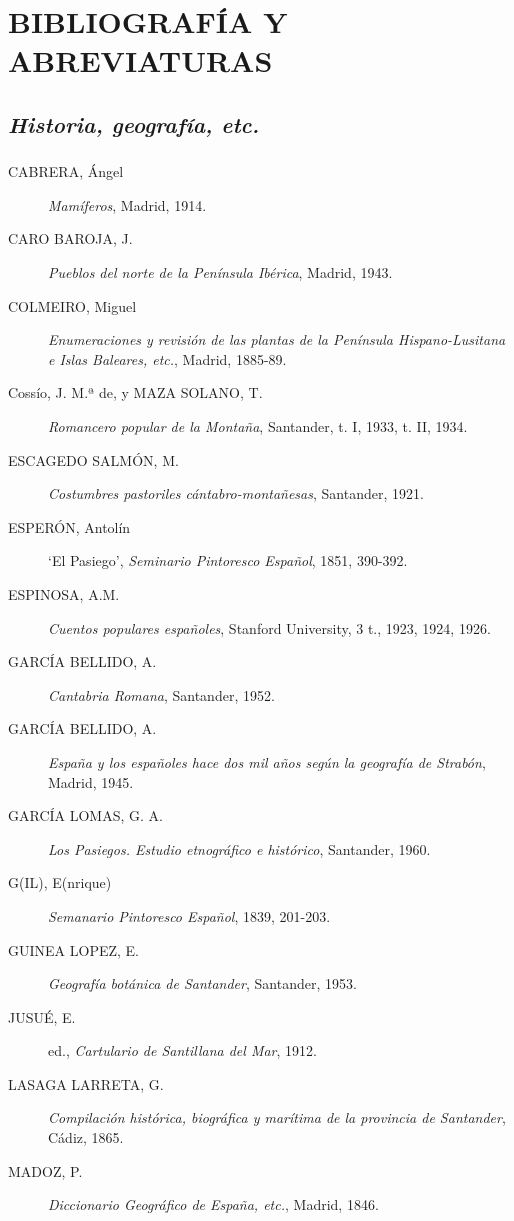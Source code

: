 \chapter{BIBLIOGRAFÍA Y ABREVIATURAS}
\section{\emph{Historia, geografía, etc.}}

\subsection{} \begin{description} 
\item[CABRERA, Ángel] \textit{Mamíferos}, Madrid, 1914.
\item[CARO BAROJA, J.] \textit{Pueblos del norte de la Península Ibérica}, Madrid, 1943.
\item[COLMEIRO, Miguel] \textit{Enumeraciones y revisión de las plantas de la Península Hispano-Lusitana e Islas Baleares, etc.}, Madrid, 1885-89.
\item[Cossío, J. M.ª de, y MAZA SOLANO, T.] \textit{Romancero popular de la Montaña}, Santander, t. I, 1933, t. II, 1934. 
\item[ESCAGEDO SALMÓN, M.] \textit{Costumbres pastoriles cántabro-montañesas}, Santander, 1921.
\item[ESPERÓN, Antolín] `El Pasiego', \textit{Seminario Pintoresco Español}, 1851, 390-392.
\item[ESPINOSA, A.M.] \textit{Cuentos populares españoles}, Stanford University, 3 t., 1923, 1924, 1926. 
\item[GARCÍA BELLIDO, A.] \textit{Cantabria Romana}, Santander, 1952. 
\item[GARCÍA BELLIDO, A.] \textit{España y los españoles hace dos mil años según la geografía de Strabón}, Madrid, 1945.
\item[GARCÍA LOMAS, G. A.] \textit{Los Pasiegos. Estudio etnográfico e histórico}, Santander, 1960.
\item[G(IL), E(nrique)] \textit{Semanario Pintoresco Español}, 1839, 201-203. 
\item[GUINEA LOPEZ, E.] \textit{Geografía botánica de Santander}, Santander, 1953. 
\item[JUSUÉ, E.] ed., \textit{Cartulario de Santillana del Mar}, 1912. 
\item[LASAGA LARRETA, G.] \textit{Compilación histórica, biográfica y marítima de la provincia de Santander}, Cádiz, 1865.
\item[MADOZ, P.] \textit{Diccionario Geográfico de España, etc.}, Madrid, 1846.

\end{description}
